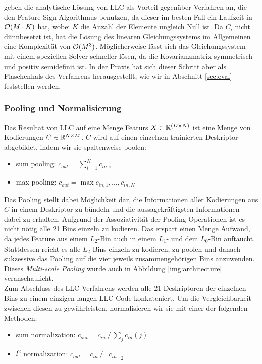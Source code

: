 \cite{wyylhg10} geben die analytische Lösung von LLC als Vorteil gegenüber Verfahren an, die den Feature Sign Algorithmus benutzen, da dieser im besten Fall ein Laufzeit in $\mathcal{O}(M \cdot K)$ hat, wobei $K$ die Anzahl der Elemente ungleich Null ist. Da $C_i$ nicht dünnbesetzt ist, hat die Lösung des linearen Gleichungssystems im Allgemeinen eine Komplexität von $\mathcal{O}(M^3)$. Möglicherweise lässt sich das Gleichungssystem mit einem speziellen Solver schneller lösen, da die Kovarianzmatrix symmetrisch und positiv semidefinit ist. In der Praxis hat sich dieser Schritt aber als Flaschenhals des Verfahrens herausgestellt, wie wir in Abschnitt \ref{sec:eval} feststellen werden.

\subsubsection{Pooling und Normalisierung}

Das Resultat von LLC auf eine Menge Featurs $X \in \mathbb{R}^{(D \times N)}$ ist eine Menge von Kodierungen $C \in \mathbb{R}^{N \times M}$. $C$ wird auf einen einzelnen trainierten Deskriptor abgebildet, indem wir sie spaltenweise poolen:

\begin{itemize}
	\item sum pooling: $c_{out} = \sum_{i=1}^{N} c_{in, i}$
	\item max pooling: $c_{out} = \max{c_{in, 1}, \dots, c_{in, N}}$
\end{itemize} 

Das Pooling stellt dabei Möglichkeit dar, die Informationen aller Kodierungen aus $C$ in einem Deskriptor zu bündeln und die aussagekräftigsten Informationen dabei zu erhalten. Aufgrund der Assoziativität der Pooling-Operationen ist es nicht nötig alle 21 Bins einzeln zu kodieren. Das erspart einen Menge Aufwand, da jedes Feature aus einem $L_2$-Bin auch in einem $L_1$- und dem $L_0$-Bin auftaucht. Stattdessen reicht es alle $L_2$-Bins einzeln zu kodieren, zu poolen und danach sukzessive das Pooling auf die vier jeweils zusammengehörigen Bins anzuwenden. Dieses \emph{Multi-scale Pooling} wurde auch in Abbildung \ref{img:architecture} veranschaulicht. \\
Zum Abschluss des LLC-Verfahrens werden alle 21 Deskriptoren der einzelnen Bins zu einem einzigen langen LLC-Code konkateniert. Um die Vergleichbarkeit zwischen diesen zu gewährleisten, normalisieren wir sie mit einer der folgenden Methoden:

\begin{itemize}
	\item sum normalization: $c_{out} = c_{in}\: / \: \sum_j c_{in}(j)$
	\item $l^2$ normalization: $c_{out} = c_{in}\: / \: ||c_{in}||_2$
\end{itemize}

